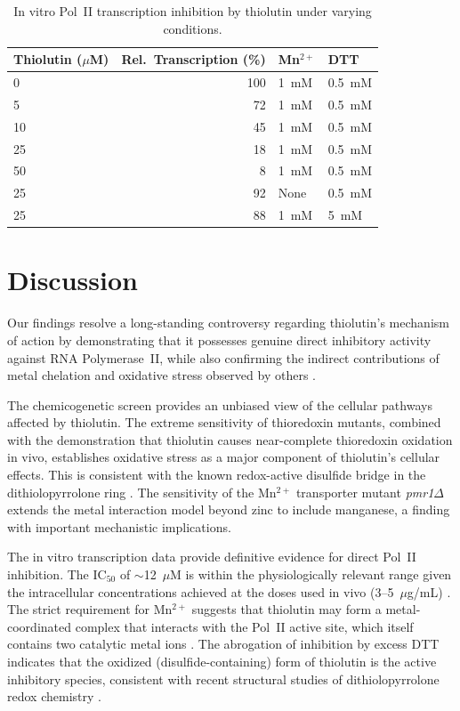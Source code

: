 \documentclass[11pt]{article}
\begin{document}
\begin{table}[ht]
\centering
\caption{In vitro Pol~II transcription inhibition by thiolutin under varying conditions.}
\label{tab:invitro}
\begin{tabular}{lrll}
\toprule
\textbf{Thiolutin ($\mu$M)} & \textbf{Rel.\ Transcription (\%)} & \textbf{Mn$^{2+}$} & \textbf{DTT} \\
\midrule
0 & 100 & 1~mM & 0.5~mM \\
5 & 72 & 1~mM & 0.5~mM \\
10 & 45 & 1~mM & 0.5~mM \\
25 & 18 & 1~mM & 0.5~mM \\
50 & 8 & 1~mM & 0.5~mM \\
25 & 92 & None & 0.5~mM \\
25 & 88 & 1~mM & 5~mM \\
\bottomrule
\end{tabular}
\end{table}

\section{Discussion}

Our findings resolve a long-standing controversy regarding thiolutin's mechanism of action by demonstrating that it possesses genuine direct inhibitory activity against RNA Polymerase~II, while also confirming the indirect contributions of metal chelation and oxidative stress observed by others \citep{lauinger2017}.

The chemicogenetic screen provides an unbiased view of the cellular pathways affected by thiolutin. The extreme sensitivity of thioredoxin mutants, combined with the demonstration that thiolutin causes near-complete thioredoxin oxidation in vivo, establishes oxidative stress as a major component of thiolutin's cellular effects. This is consistent with the known redox-active disulfide bridge in the dithiolopyrrolone ring \citep{li2007,oliva2001}. The sensitivity of the Mn$^{2+}$ transporter mutant \textit{pmr1$\Delta$} extends the metal interaction model beyond zinc to include manganese, a finding with important mechanistic implications.

The in vitro transcription data provide definitive evidence for direct Pol~II inhibition. The IC$_{50}$ of $\sim$12~$\mu$M is within the physiologically relevant range given the intracellular concentrations achieved at the doses used in vivo (3--5~$\mu$g/mL) \citep{jimenez1973}. The strict requirement for Mn$^{2+}$ suggests that thiolutin may form a metal-coordinated complex that interacts with the Pol~II active site, which itself contains two catalytic metal ions \citep{cramer2001,gnatt2001}. The abrogation of inhibition by excess DTT indicates that the oxidized (disulfide-containing) form of thiolutin is the active inhibitory species, consistent with recent structural studies of dithiolopyrrolone redox chemistry \citep{li2007}.
\end{document}

